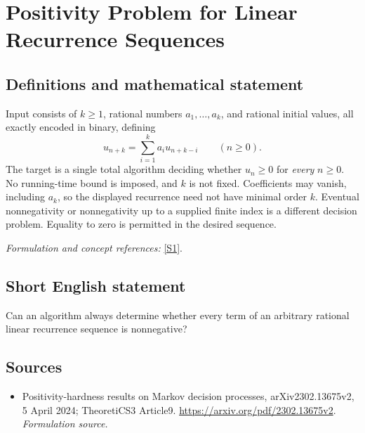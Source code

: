 \documentclass[11pt]{article}
\begin{document}
\section*{\texorpdfstring{Positivity Problem for Linear Recurrence Sequences}{Positivity Problem for Linear Recurrence Sequences}}\label{296}
\subsection{Definitions and mathematical statement}
Input consists of $k\ge1$, rational numbers $a_1,\ldots,a_k$, and rational initial values, all exactly encoded in binary, defining
\[
 u_{n+k}=\sum_{i=1}^k a_i u_{n+k-i}\qquad(n\ge0).
\]
The target is a single total algorithm deciding whether $u_n\ge0$ for \emph{every} $n\ge0$. No running-time bound is imposed, and $k$ is not fixed. Coefficients may vanish, including $a_k$, so the displayed recurrence need not have minimal order $k$. Eventual nonnegativity or nonnegativity up to a supplied finite index is a different decision problem. Equality to zero is permitted in the desired sequence.
\par\smallskip\textit{Formulation and concept references:} \href{https://arxiv.org/pdf/2302.13675v2}{[S1]}.

\subsection{Short English statement}
Can an algorithm always determine whether every term of an arbitrary rational linear recurrence sequence is nonnegative?
\subsection{Sources}
\begin{itemize}
\item[S1]Positivity-hardness results on Markov decision processes, arXiv2302.13675v2, 5 April 2024; TheoretiCS3 Article9.
\url{https://arxiv.org/pdf/2302.13675v2}.
\textit{Formulation source.}
\end{itemize}
\end{document}
